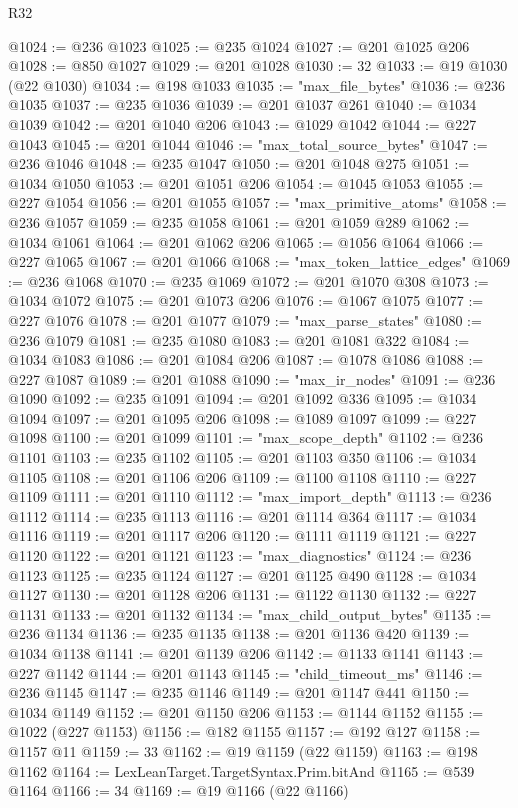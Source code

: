 \begin{lexlean}{R32}
\begin{coremodule}
@1024 := @236 @1023
@1025 := @235 @1024
@1027 := @201 @1025 @206
@1028 := @850 @1027
@1029 := @201 @1028
@1030 := 32
@1033 := @19 @1030 (@22 @1030)
@1034 := @198 @1033
@1035 := "max_file_bytes"
@1036 := @236 @1035
@1037 := @235 @1036
@1039 := @201 @1037 @261
@1040 := @1034 @1039
@1042 := @201 @1040 @206
@1043 := @1029 @1042
@1044 := @227 @1043
@1045 := @201 @1044
@1046 := "max_total_source_bytes"
@1047 := @236 @1046
@1048 := @235 @1047
@1050 := @201 @1048 @275
@1051 := @1034 @1050
@1053 := @201 @1051 @206
@1054 := @1045 @1053
@1055 := @227 @1054
@1056 := @201 @1055
@1057 := "max_primitive_atoms"
@1058 := @236 @1057
@1059 := @235 @1058
@1061 := @201 @1059 @289
@1062 := @1034 @1061
@1064 := @201 @1062 @206
@1065 := @1056 @1064
@1066 := @227 @1065
@1067 := @201 @1066
@1068 := "max_token_lattice_edges"
@1069 := @236 @1068
@1070 := @235 @1069
@1072 := @201 @1070 @308
@1073 := @1034 @1072
@1075 := @201 @1073 @206
@1076 := @1067 @1075
@1077 := @227 @1076
@1078 := @201 @1077
@1079 := "max_parse_states"
@1080 := @236 @1079
@1081 := @235 @1080
@1083 := @201 @1081 @322
@1084 := @1034 @1083
@1086 := @201 @1084 @206
@1087 := @1078 @1086
@1088 := @227 @1087
@1089 := @201 @1088
@1090 := "max_ir_nodes"
@1091 := @236 @1090
@1092 := @235 @1091
@1094 := @201 @1092 @336
@1095 := @1034 @1094
@1097 := @201 @1095 @206
@1098 := @1089 @1097
@1099 := @227 @1098
@1100 := @201 @1099
@1101 := "max_scope_depth"
@1102 := @236 @1101
@1103 := @235 @1102
@1105 := @201 @1103 @350
@1106 := @1034 @1105
@1108 := @201 @1106 @206
@1109 := @1100 @1108
@1110 := @227 @1109
@1111 := @201 @1110
@1112 := "max_import_depth"
@1113 := @236 @1112
@1114 := @235 @1113
@1116 := @201 @1114 @364
@1117 := @1034 @1116
@1119 := @201 @1117 @206
@1120 := @1111 @1119
@1121 := @227 @1120
@1122 := @201 @1121
@1123 := "max_diagnostics"
@1124 := @236 @1123
@1125 := @235 @1124
@1127 := @201 @1125 @490
@1128 := @1034 @1127
@1130 := @201 @1128 @206
@1131 := @1122 @1130
@1132 := @227 @1131
@1133 := @201 @1132
@1134 := "max_child_output_bytes"
@1135 := @236 @1134
@1136 := @235 @1135
@1138 := @201 @1136 @420
@1139 := @1034 @1138
@1141 := @201 @1139 @206
@1142 := @1133 @1141
@1143 := @227 @1142
@1144 := @201 @1143
@1145 := "child_timeout_ms"
@1146 := @236 @1145
@1147 := @235 @1146
@1149 := @201 @1147 @441
@1150 := @1034 @1149
@1152 := @201 @1150 @206
@1153 := @1144 @1152
@1155 := @1022 (@227 @1153)
@1156 := @182 @1155
@1157 := @192 @127
@1158 := @1157 @11
@1159 := 33
@1162 := @19 @1159 (@22 @1159)
@1163 := @198 @1162
@1164 := LexLeanTarget.TargetSyntax.Prim.bitAnd
@1165 := @539 @1164
@1166 := 34
@1169 := @19 @1166 (@22 @1166)

\end{coremodule}
\end{lexlean}
